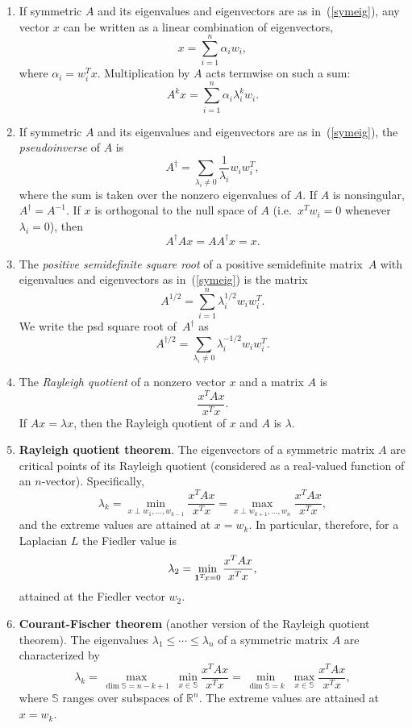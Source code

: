 \documentclass[11pt]{article}
\newcommand{\m}[1]{{\bf{#1}}}       %
\newcommand{\ones}{\m1}             %
\newcommand{\pinv}{^{\dagger}}                  %
\newcommand{\Real}{\mathbb{R}}      %
\begin{document}
\begin{enumerate}
\item
If symmetric $A$ and its eigenvalues and eigenvectors are as in~(\ref{symeig}), 
any vector $x$ can be written as a linear combination of eigenvectors,
$$x = \sum_{i=1}^n \alpha_i w_i,$$
where $\alpha_i = w_i^Tx.$  
Multiplication by $A$ acts termwise on such a sum:
$$A^k x = \sum_{i=1}^n \alpha_i\lambda_i^k w_i.$$

\item
If symmetric $A$ and its eigenvalues and eigenvectors are as in~(\ref{symeig}), 
the {\em pseudoinverse} of $A$ is
$$A\pinv = \sum_{\lambda_i\ne 0} \frac{1}{\lambda_i} w_iw_i^T,$$
where the sum is taken over the nonzero eigenvalues of $A$.
If $A$ is nonsingular, $A\pinv=A^{-1}$.
If $x$ is orthogonal to the null space of $A$ 
(i.e.\ $x^Tw_i=0$ whenever $\lambda_i=0$), then
$$A\pinv A x = AA\pinv x = x.$$

\item
The {\em positive semidefinite square root} of a positive semidefinite matrix~$A$
with eigenvalues and eigenvectors as in~(\ref{symeig}) is the matrix
$$A^{1/2} = \sum_{i=1}^n \lambda_i^{1/2} w_iw_i^T.$$
We write the psd square root of~$A\pinv$ as 
$$A^{\dagger/2} = \sum_{\lambda_i\ne 0} \lambda_i^{-1/2} w_iw_i^T.$$

\item
The {\em Rayleigh quotient} of a nonzero vector $x$ and a matrix $A$ is
$$\frac{x^TAx}{x^Tx}.$$
If $Ax=\lambda x$, then the Rayleigh quotient of $x$ and $A$ is $\lambda$.

\item\label{RQT}{\bf Rayleigh quotient theorem}.
The eigenvectors of a symmetric matrix $A$ are critical points of its
Rayleigh quotient (considered as a real-valued function of an $n$-vector).
Specifically, 
$$\lambda_k = \min_{x\perp w_1,\ldots,w_{k-1}} \frac{x^TAx}{x^Tx}
            = \max_{x\perp w_{k+1},\ldots,w_n} \frac{x^TAx}{x^Tx},$$
and the extreme values are attained at $x = w_k$.
In particular, therefore, for a Laplacian $L$ the Fiedler value is
$$\lambda_2 = \min_{\ones^T\!x=0} \frac{x^TAx}{x^Tx},$$
attained at the Fiedler vector $w_2$.

\item\label{CFT}{\bf Courant-Fischer theorem}
(another version of the Rayleigh quotient theorem).
The eigenvalues $\lambda_1\leq\cdots\leq\lambda_n$ of a symmetric matrix $A$ 
are characterized by
$$\lambda_k = \max_{\dim \mathbb{S}=n-k+1}\;\min_{x\in \mathbb{S}}\frac{x^TAx}{x^Tx}
            = \min_{\dim \mathbb{S}=k}\;\max_{x\in \mathbb{S}}\frac{x^TAx}{x^Tx},$$
where $\mathbb{S}$ ranges over subspaces of $\Real^n$.
The extreme values are attained at $x = w_k$.


\end{enumerate}
\end{document}
